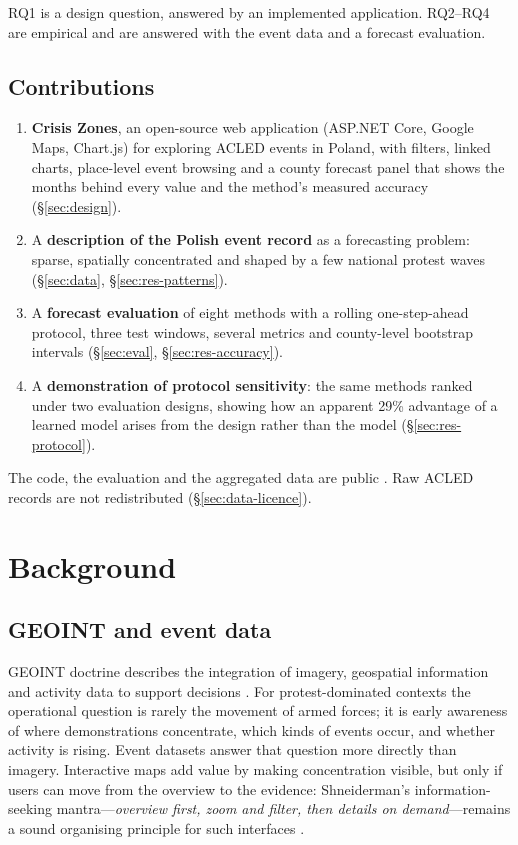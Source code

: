 \documentclass[11pt,a4paper]{article}
\newcommand{\appname}{Crisis Zones}
\begin{document}
RQ1 is a design question, answered by an implemented application. RQ2--RQ4 are empirical and are answered with the event data and a forecast evaluation.

\subsection{Contributions}

\begin{enumerate}
  \item \textbf{\appname{}}, an open-source web application (ASP.NET Core, Google Maps, Chart.js) for exploring ACLED events in Poland, with filters, linked charts, place-level event browsing and a county forecast panel that shows the months behind every value and the method's measured accuracy (\S\ref{sec:design}).
  \item A \textbf{description of the Polish event record} as a forecasting problem: sparse, spatially concentrated and shaped by a few national protest waves (\S\ref{sec:data}, \S\ref{sec:res-patterns}).
  \item A \textbf{forecast evaluation} of eight methods with a rolling one-step-ahead protocol, three test windows, several metrics and county-level bootstrap intervals (\S\ref{sec:eval}, \S\ref{sec:res-accuracy}).
  \item A \textbf{demonstration of protocol sensitivity}: the same methods ranked under two evaluation designs, showing how an apparent 29\% advantage of a learned model arises from the design rather than the model (\S\ref{sec:res-protocol}).
\end{enumerate}

The code, the evaluation and the aggregated data are public \cite{repo}. Raw ACLED records are not redistributed (\S\ref{sec:data-licence}).

\section{Background}
\label{sec:background}

\subsection{GEOINT and event data}

GEOINT doctrine describes the integration of imagery, geospatial information and activity data to support decisions \cite{nga2018}. For protest-dominated contexts the operational question is rarely the movement of armed forces; it is early awareness of where demonstrations concentrate, which kinds of events occur, and whether activity is rising. Event datasets answer that question more directly than imagery. Interactive maps add value by making concentration visible, but only if users can move from the overview to the evidence: Shneiderman's information-seeking mantra---\emph{overview first, zoom and filter, then details on demand}---remains a sound organising principle for such interfaces \cite{shneiderman1996}.
\end{document}
